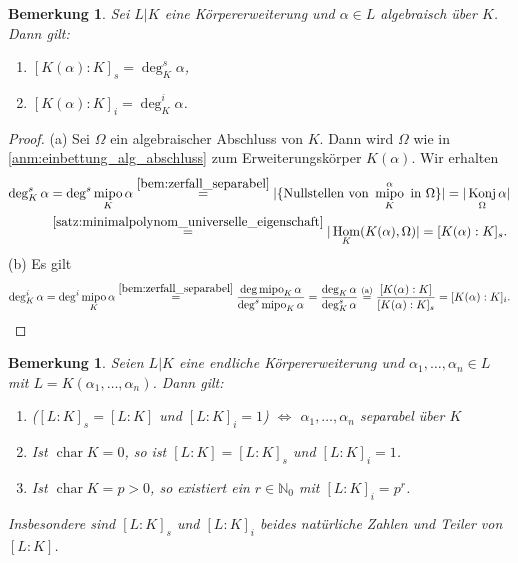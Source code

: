 \documentclass[a4paper, twoside, 11pt, ngerman]{report}
\newcommand{\NN}{\mathds N}
\DeclareMathOperator{\charact}{char}
\DeclareMathOperator{\Hom}{Hom}
\DeclareMathOperator{\Konj}{Konj}
\DeclareMathOperator{\mipo}{mipo}
\theoremstyle{definistyle}
\newtheorem{bem}[satz]{Bemerkung}
\theoremstyle{remark}
\begin{document}
\begin{bem}\label{bem:separabilitaet_grad}
Sei $L|K$ eine Körpererweiterung und $\alpha \in L$ algebraisch über $K$. Dann gilt:
\begin{enumerate}
\item[(a)] $[K(\alpha) : K]_s = \deg^s_K \alpha$,
\item[(b)] $[K(\alpha) : K]_i = \deg^i_K \alpha$.
\end{enumerate}
\end{bem}
\begin{proof}
(a) Sei $\Omega$ ein algebraischer Abschluss von $K$. Dann wird $\Omega$ wie in \ref{anm:einbettung_alg_abschluss}
zum Erweiterungskörper $K(\alpha)$.  Wir erhalten
\begin{align*}
\deg^s_K \alpha &= \deg^s \mipo_K \alpha \overset{\ref{bem:zerfall_separabel}}{=} |\{ \text{Nullstellen von } \mipo_K^ \alpha \text{ in } \Omega \}| =|\Konj_\Omega\alpha|\\
&\overset{\ref{satz:minimalpolynom_universelle_eigenschaft}}{=}|\Hom_K(K(\alpha),\Omega)| 
=[K(\alpha) : K]_s.
\end{align*}
(b) Es gilt
\[
\deg^i_K \alpha = \deg^i\mipo_K\alpha\overset{\ref{bem:zerfall_separabel}}=\frac{\deg \mipo_K \alpha}{\deg^s \mipo_K \alpha}=\frac{\deg_K\alpha}{\deg^s_K\alpha} \overset{\text{(a)}}{=} \frac{[K(\alpha):K]}{[K(\alpha):K]_s}=[K(\alpha):K]_i.
\]
\end{proof}

\begin{bem}\label{bem:sep_und_insep_grad}
Seien $L|K$ eine endliche Körpererweiterung und $\alpha_1, \dots, \alpha_n \in L$ mit $L = K(\alpha_1, \dots, \alpha_n)$. Dann gilt:
\begin{enumerate}
    \item[(a)] ($[L : K]_s = [L : K]$ und $[L:K]_i=1$) $\iff$ $\alpha_1, \dots, \alpha_n$ separabel über $K$
    \item[(b)] Ist $\charact K = 0$, so ist $[L : K] = [L : K]_s$ und $[L : K]_i = 1$.
    \item[(c)] Ist $\charact K = p > 0$, so existiert ein $r \in \NN_0$ mit $[L : K]_i = p^r$.
\end{enumerate}
Insbesondere sind $[L : K]_s$ und $[L:K]_i$ beides natürliche Zahlen und Teiler von $[L : K]$.
\end{bem}
\end{document}
